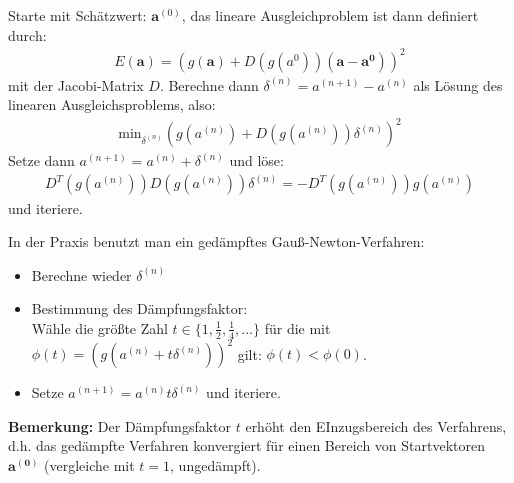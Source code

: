 \documentclass{scrartcl}
\begin{document}
Starte mit Schätzwert: $\boldsymbol{a}^{(0)}$, das lineare Ausgleichproblem ist dann definiert durch:
\begin{align*}
E(\boldsymbol{a}) = (g(\boldsymbol{a})+ D(g(a^0))(\boldsymbol{a}-\boldsymbol{a^0}))^2
\end{align*}
mit der Jacobi-Matrix $D$.
Berechne dann $\delta^{(n)}=a^{(n+1)}-a^{(n)}$ als Lösung des linearen Ausgleichsproblems, also:
\begin{align*}
\text{min}_{\delta^{(n)}}(g(a^{(n)})+D(g(a^{(n)})) \delta^{(n)})^2
\end{align*}
Setze dann $a^{(n+1)}= a^{(n)}+ \delta ^{(n)}$ und löse:
\begin{align*}
D^T(g(a^{(n)})) D(g(a^{(n)})) \delta^{(n)} = - D^T(g(a^{(n)})) g(a^{(n)})
\end{align*}
und iteriere. 

In der Praxis benutzt man ein gedämpftes Gauß-Newton-Verfahren:
\begin{itemize}
\item Berechne wieder $\delta^{(n)}$
\item Bestimmung des Dämpfungsfaktor: \\
Wähle die größte Zahl $t \in \{1, \frac{1}{2}, \frac{1}{4},...\}$ für die mit $\phi(t)=(g(a^{(n)}+t \delta^{(n)}))^2$ gilt: $\phi(t) < \phi(0)$.
\item Setze $a^{(n+1)} = a^{(n)} t \delta^{(n)}$ und iteriere.
\end{itemize}
\textbf{Bemerkung:} Der Dämpfungsfaktor $t$ erhöht den EInzugsbereich des Verfahrens, d.h. das gedämpfte Verfahren konvergiert für einen Bereich von Startvektoren $\boldsymbol{a^{(0)}}$ (vergleiche mit $t=1$, ungedämpft).
\end{document}
